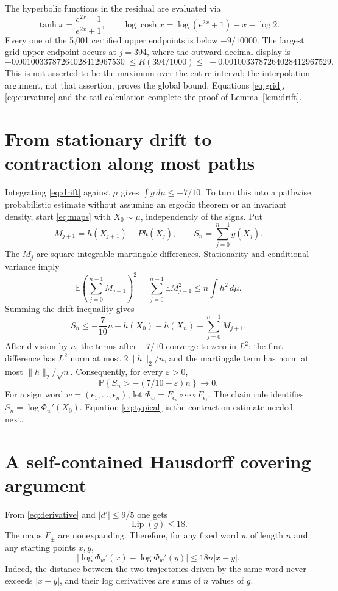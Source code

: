 \documentclass[11pt]{article}
\theoremstyle{remark}
\newcommand{\E}{\mathbb E}
\newcommand{\PP}{\mathbb P}
\newcommand{\Lip}{\operatorname{Lip}}
\begin{document}
The hyperbolic functions in the residual are evaluated via
\[
\tanh x=\frac{e^{2x}-1}{e^{2x}+1},\qquad
\log\cosh x=\log(e^{2x}+1)-x-\log2.
\]
Every one of the 5,001 certified upper endpoints is below $-9/10000$. The largest grid upper endpoint occurs at $j=394$, where the outward decimal display is
\begin{equation}\label{eq:worst}
-0.0010033787264028412967530
\;\le R(394/1000)\le\;
-0.0010033787264028412967529.
\end{equation}
This is not asserted to be the maximum over the entire interval; the interpolation argument, not that assertion, proves the global bound. Equations \eqref{eq:grid}, \eqref{eq:curvature} and the tail calculation complete the proof of Lemma~\ref{lem:drift}.

\section{From stationary drift to contraction along most paths}
Integrating \eqref{eq:drift} against $\mu$ gives $\int g\,d\mu\le-7/10$. To turn this into a pathwise probabilistic estimate without assuming an ergodic theorem or an invariant density, start \eqref{eq:maps} with $X_0\sim\mu$, independently of the signs. Put
\[
M_{j+1}=h(X_{j+1})-Ph(X_j),\qquad
S_n=\sum_{j=0}^{n-1}g(X_j).
\]
The $M_j$ are square-integrable martingale differences. Stationarity and conditional variance imply
\[
\E\left(\sum_{j=0}^{n-1}M_{j+1}\right)^2
=\sum_{j=0}^{n-1}\E M_{j+1}^2
\le n\int h^2\,d\mu.
\]
Summing the drift inequality gives
\begin{equation}\label{eq:mart}
S_n\le-\frac7{10}n+h(X_0)-h(X_n)+\sum_{j=0}^{n-1}M_{j+1}.
\end{equation}
After division by $n$, the terms after $-7/10$ converge to zero in $L^2$: the first difference has $L^2$ norm at most $2\|h\|_2/n$, and the martingale term has norm at most $\|h\|_2/\sqrt n$. Consequently, for every $\varepsilon>0$,
\begin{equation}\label{eq:typical}
\PP\left\{S_n>-(7/10-\varepsilon)n\right\}\longrightarrow0.
\end{equation}
For a sign word $w=(\epsilon_1,\ldots,\epsilon_n)$, let
$\Phi_w=F_{\epsilon_n}\circ\cdots\circ F_{\epsilon_1}$. The chain rule identifies $S_n=\log\Phi_w'(X_0)$. Equation \eqref{eq:typical} is the contraction estimate needed next.

\section{A self-contained Hausdorff covering argument}
From \eqref{eq:derivative} and $|d'|\le9/5$ one gets
\begin{equation}\label{eq:lipg}
\Lip(g)\le18.
\end{equation}
The maps $F_\pm$ are nonexpanding. Therefore, for any fixed word $w$ of length $n$ and any starting points $x,y$,
\begin{equation}\label{eq:distortion}
|\log\Phi_w'(x)-\log\Phi_w'(y)|
\le18n|x-y|.
\end{equation}
Indeed, the distance between the two trajectories driven by the same word never exceeds $|x-y|$, and their log derivatives are sums of $n$ values of $g$.
\end{document}
